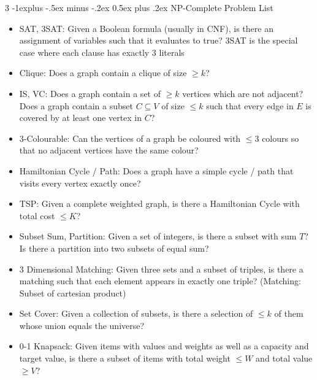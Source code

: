 \documentclass[10pt, landscape]{article}
\makeatletter
\renewcommand{\section}{\@startsection{section}{1}{0mm}%
                                {-1ex plus -.5ex minus -.2ex}%
                                {0.5ex plus .2ex}%
                                {\normalfont\large\bfseries}}
\renewcommand{\section}{\@startsection{section}{2}{0mm}%
                                {-1explus -.5ex minus -.2ex}%
                                {0.5ex plus .2ex}%
                                {\normalfont\normalsize\bfseries}}
\makeatother
\begin{document}
\begin{multicols*}{3}
\section{NP-Complete Problem List}
\begin{itemize}
    \item SAT, 3SAT: Given a Boolean formula (usually in CNF), is there an assignment of variables such that it evaluates to true? 3SAT is the special case where each clause has exactly 3 literals
    \item Clique: Does a graph contain a clique of size $\geq k$?
    \item IS, VC: Does a graph contain a set of $\geq k$ vertices which are not adjacent? Does a graph contain a subset $C \subseteq V$ of size $\leq k$ such that every edge in $E$ is covered by at least one vertex in $C$?
    \item 3-Colourable: Can the vertices of a graph be coloured with $\leq 3$ colours so that no adjacent vertices have the same colour?
    \item Hamiltonian Cycle / Path: Does a graph have a simple cycle / path that visits every vertex exactly once?
    \item TSP: Given a complete weighted graph, is there a Hamiltonian Cycle with total cost $\leq K$?
    \item Subset Sum, Partition: Given a set of integers, is there a subset with sum $T$? Is there a partition into two subsets of equal sum?
    \item 3 Dimensional Matching: Given three sets and a subset of triples, is there a matching such that each element appears in exactly one triple? (Matching: Subset of cartesian product)
    \item Set Cover: Given a collection of subsets, is there a selection of $\leq k$ of them whose union equals the universe?
    \item 0-1 Knapsack: Given items with values and weights as well as a capacity and target value, is there a subset of items with total weight $\leq W$ and total value $\geq V$?
\end{itemize}


\end{multicols*}
\end{document}
